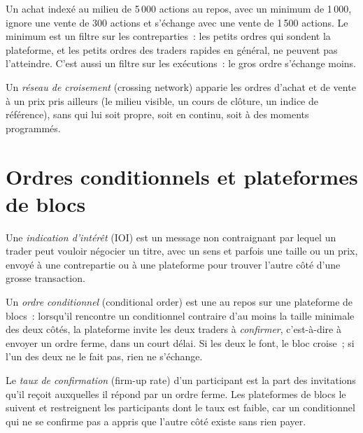 Un achat indexé au milieu de 5\,000 actions au repos, avec un minimum de 1\,000, ignore une vente de 300 actions et s'échange avec une vente de 1\,500 actions. Le minimum est un filtre sur
les contreparties~: les petits ordres qui sondent la plateforme, et les petits ordres des traders rapides en général, ne peuvent pas l'atteindre. C'est aussi un filtre sur les exécutions~: le
gros ordre s'échange moins.

\begin{definition}\label{def:mx:dark-pools-and-blocks:crossing}
Un \emph{réseau de croisement} (crossing network) apparie les ordres d'achat et de vente à un prix pris ailleurs (le milieu visible, un cours de clôture, un
indice de référence), sans  qui lui soit propre, soit en continu, soit à des moments programmés.
\end{definition}

\section{Ordres conditionnels et plateformes de blocs}

\begin{definition}\label{def:mx:dark-pools-and-blocks:ioi}
Une \emph{indication d'intérêt} (IOI) est un message non contraignant par lequel un trader peut vouloir négocier un titre, avec un sens
et parfois une taille ou un prix, envoyé à une contrepartie ou à une plateforme pour trouver l'autre côté d'une grosse transaction.
\end{definition}

\begin{definition}\label{def:mx:dark-pools-and-blocks:conditional}
Un \emph{ordre conditionnel} (conditional order) est une  au repos sur une plateforme de blocs~: lorsqu'il rencontre un conditionnel contraire d'au moins
la taille minimale des deux côtés, la plateforme invite les deux traders à \emph{confirmer}, c'est-à-dire à envoyer un ordre ferme, dans un court délai. Si les deux le font, le bloc
croise~; si l'un des deux ne le fait pas, rien ne s'échange.
\end{definition}

\begin{definition}\label{def:mx:dark-pools-and-blocks:firmup}
Le \emph{taux de confirmation} (firm-up rate) d'un participant est la part des invitations qu'il reçoit auxquelles il répond par un ordre ferme. Les plateformes de blocs
le suivent et restreignent les participants dont le taux est faible, car un conditionnel qui ne se confirme pas a appris que l'autre côté existe sans rien payer.
\end{definition}

